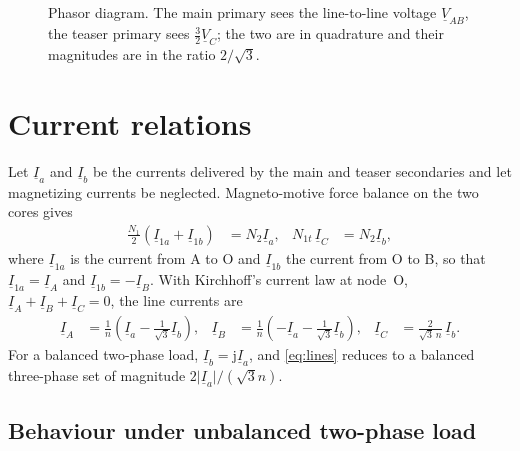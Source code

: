 \documentclass[11pt,a4paper]{article}
\newcommand{\ph}[1]{\underline{#1}}
\begin{document}
\begin{figure}[htbp]
\centering
{}
\caption{Phasor diagram. The main primary sees the line-to-line voltage
$\ph{V}_{AB}$, the teaser primary sees $\tfrac{3}{2}\ph{V}_{C}$; the two are in
quadrature and their magnitudes are in the ratio $2/\sqrt{3}$.}
\label{fig:phasor}
\end{figure}

\section{Current relations}

Let $\ph{I}_a$ and $\ph{I}_b$ be the currents delivered by the main and teaser
secondaries and let magnetizing currents be neglected. Magneto-motive force
balance on the two cores gives
\begin{align}
\frac{N_1}{2}\left(\ph{I}_{1a} + \ph{I}_{1b}\right) &= N_2 \ph{I}_a, &
N_{1t}\,\ph{I}_C &= N_2 \ph{I}_b ,
\end{align}
where $\ph{I}_{1a}$ is the current from A to O and $\ph{I}_{1b}$ the current
from O to B, so that $\ph{I}_{1a} = \ph{I}_A$ and $\ph{I}_{1b} = -\ph{I}_B$.
With Kirchhoff's current law at node~O, $\ph{I}_A+\ph{I}_B+\ph{I}_C = 0$, the
line currents are
\begin{align}
\ph{I}_A &= \frac{1}{n}\left(\ph{I}_a - \tfrac{1}{\sqrt{3}}\ph{I}_b\right), &
\ph{I}_B &= \frac{1}{n}\left(-\ph{I}_a - \tfrac{1}{\sqrt{3}}\ph{I}_b\right), &
\ph{I}_C &= \frac{2}{\sqrt{3}\,n}\,\ph{I}_b .
\label{eq:lines}
\end{align}
For a balanced two-phase load, $\ph{I}_b = \mathrm{j}\ph{I}_a$, and
\eqref{eq:lines} reduces to a balanced three-phase set of magnitude
$2\lvert\ph{I}_a\rvert/(\sqrt{3}n)$.

\subsection*{Behaviour under unbalanced two-phase load}
\end{document}
